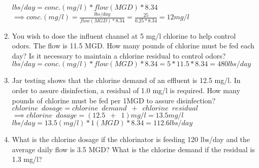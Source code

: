 \documentclass{article}
\begin{document}
\begin{enumerate}
$lbs/day=conc. (mg/l)*flow(MGD)*8.34$\\
$\implies conc. (mg/l)=\frac{lbs/day}{flow(MGD)*8.34}=\frac{25}{0.25*8.34}=\boxed{12mg/l}$
\vspace{0.25cm}
\item You wish to dose the influent channel at 5 mg/l chlorine to help control odors. The flow is 11.5 MGD. How many pounds of chlorine must be fed each day? Is it necessary to maintain a chlorine residual to control odors?\\
\vspace{0.25cm}
$lbs/day=conc. (mg/l)*flow(MGD)*8.34=5*11.5*8.34=\boxed{480lbs/day}$\\
\vspace{0.25cm}
\item Jar testing shows that the chlorine demand of an effluent is 12.5 mg/l. In order to assure disinfection, a residual of 1.0 mg/l is required. How many pounds of chlorine must be fed per 1MGD to assure disinfection?\\
\vspace{0.25cm} 
$ chlorine \enspace dosage = chlorine \enspace demand \enspace + \enspace chlorine \enspace residual$\\
\vspace{0.25cm}
$\implies chlorine \enspace dosage = (12.5 \enspace + \enspace 1 )mg/l=13.5 mg/l$\\
\vspace{0.25cm}
$lbs/day=13.5(mg/l)*1(MGD)*8.34=\boxed{112.6 lbs/day}$\\
\vspace{0.25cm}
\item What is the chlorine dosage if the chlorinator is feeding 120 lbs/day and the average daily flow is 3.5 MGD?  What is the chlorine demand if the residual is 1.3 mg/l?\\
\vspace{0.25cm}


\end{enumerate}
\end{document}
